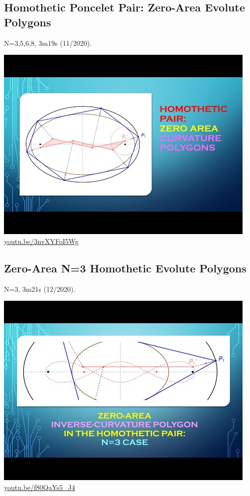 \documentclass[12pt]{amsart}
\begin{document}
\subsection{Homothetic Poncelet Pair: Zero-Area Evolute Polygons}
\label{vid:3nvXYFoI5Wg}
\noindent N=3,5,6,8, 3m19s (11/2020). 
\begin{center}\includegraphics[width=.5\textwidth]{pics/3nvXYFoI5Wg.jpg} \\ 
\href{https://youtu.be/3nvXYFoI5Wg}{\url{youtu.be/3nvXYFoI5Wg}}\end{center}
% 

\subsection{Zero-Area N=3 Homothetic Evolute Polygons}
\label{vid:f80QaYs5_J4}
\noindent N=3, 3m21s (12/2020). 
\begin{center}\includegraphics[width=.5\textwidth]{pics/f80QaYs5_J4.jpg} \\ 
\href{https://youtu.be/f80QaYs5_J4}{\url{youtu.be/f80QaYs5\_J4}}\end{center}
% 
\end{document}
